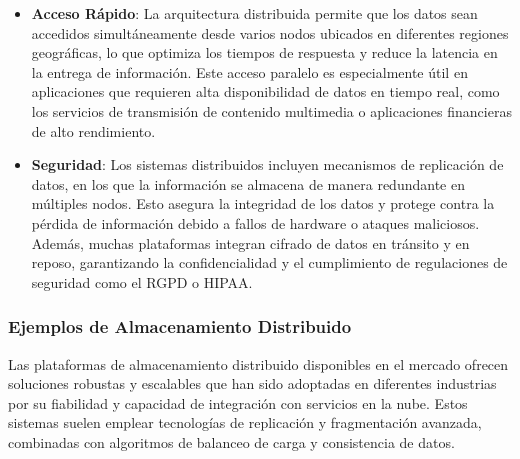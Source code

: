 {                \begin{itemize}
                    \item \textbf{Acceso Rápido}: La arquitectura distribuida permite que los datos sean accedidos simultáneamente desde varios nodos ubicados en diferentes regiones geográficas, lo que optimiza los tiempos de respuesta y reduce la latencia en la entrega de información. Este acceso paralelo es especialmente útil en aplicaciones que requieren alta disponibilidad de datos en tiempo real, como los servicios de transmisión de contenido multimedia o aplicaciones financieras de alto rendimiento.        
                    \item \textbf{Seguridad}: Los sistemas distribuidos incluyen mecanismos de replicación de datos, en los que la información se almacena de manera redundante en múltiples nodos. Esto asegura la integridad de los datos y protege contra la pérdida de información debido a fallos de hardware o ataques maliciosos. Además, muchas plataformas integran cifrado de datos en tránsito y en reposo, garantizando la confidencialidad y el cumplimiento de regulaciones de seguridad como el RGPD o HIPAA.
                \end{itemize}
                
            \subsubsection{Ejemplos de Almacenamiento Distribuido}
                Las plataformas de almacenamiento distribuido disponibles en el mercado ofrecen soluciones robustas y escalables que han sido adoptadas en diferentes industrias por su fiabilidad y capacidad de integración con servicios en la nube. Estos sistemas suelen emplear tecnologías de replicación y fragmentación avanzada, combinadas con algoritmos de balanceo de carga y consistencia de datos.
                
}
